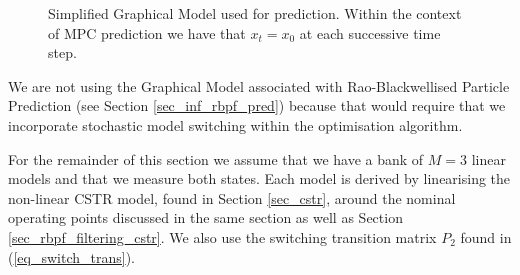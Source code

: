 \begin{figure}[H] 
\centering
{}
\caption{Simplified Graphical Model used for prediction. Within the context of MPC prediction we have that $x_t=x_0$ at each successive time step.}
\label{fig_gm_prediction}
\end{figure}
We are not using the Graphical Model associated with Rao-Blackwellised Particle Prediction (see Section \ref{sec_inf_rbpf_pred}) because that would require that we incorporate stochastic model switching within the optimisation algorithm. 

For the remainder of this section we assume that we have a bank of $M=3$ linear models and that we measure both states. Each model is derived by linearising the non-linear CSTR model, found in Section \ref{sec_cstr}, around the nominal operating points discussed in the same section as well as Section \ref{sec_rbpf_filtering_cstr}. We also use the switching transition matrix $P_2$ found in (\ref{eq_switch_trans}).

